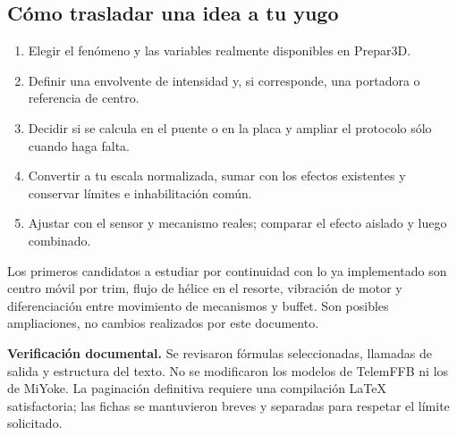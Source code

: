 \documentclass[11pt,a4paper]{article}
\begin{document}
\subsection{Cómo trasladar una idea a tu yugo}
\begin{enumerate}
\item Elegir el fenómeno y las variables realmente disponibles en Prepar3D.
\item Definir una envolvente de intensidad y, si corresponde, una portadora o referencia de centro.
\item Decidir si se calcula en el puente o en la placa y ampliar el protocolo sólo cuando haga falta.
\item Convertir a tu escala normalizada, sumar con los efectos existentes y conservar límites e inhabilitación común.
\item Ajustar con el sensor y mecanismo reales; comparar el efecto aislado y luego combinado.
\end{enumerate}
Los primeros candidatos a estudiar por continuidad con lo ya implementado son centro móvil por trim, flujo de hélice en el resorte, vibración de motor y diferenciación entre movimiento de mecanismos y buffet. Son posibles ampliaciones, no cambios realizados por este documento.

\textbf{Verificación documental.} Se revisaron fórmulas seleccionadas, llamadas de salida y estructura del texto. No se modificaron los modelos de TelemFFB ni los de MiYoke. La paginación definitiva requiere una compilación LaTeX satisfactoria; las fichas se mantuvieron breves y separadas para respetar el límite solicitado.
\end{document}
